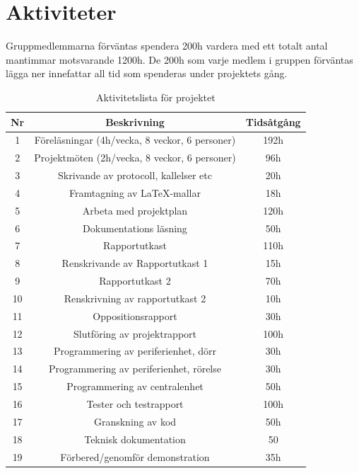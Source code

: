 \documentclass[a4paper]{article}
\begin{document}
\section{Aktiviteter}

Gruppmedlemmarna förväntas spendera 200h vardera med ett totalt antal mantimmar motsvarande 1200h. De 200h som varje medlem i gruppen förväntas lägga ner innefattar all tid som spenderas under projektets gång.

\begin{table}[H]
    \begin{center}
        \begin{tabular}{ |c|c|c| }\hline
            Nr & Beskrivning & Tidsåtgång \\\hline\hline
            1 & Föreläsningar (4h/vecka, 8 veckor, 6 personer) & 192h \\\hline
            2 & Projektmöten (2h/vecka, 8 veckor, 6 personer) & 96h \\\hline
            3 & Skrivande av protocoll, kallelser etc & 20h \\\hline
            4 & Framtagning av LaTeX-mallar & 18h \\\hline
            5 & Arbeta med projektplan & 120h \\\hline
            6 & Dokumentations läsning & 50h \\\hline
            7 & Rapportutkast & 110h \\\hline
            8 & Renskrivande av Rapportutkast 1 & 15h \\\hline
            9 & Rapportutkast 2 & 70h\\\hline
            10 & Renskrivning av rapportutkast 2 & 10h \\\hline
            11 & Oppositionsrapport & 30h\\\hline
            12 & Slutföring av projektrapport & 100h\\\hline
            13 & Programmering av periferienhet, dörr & 30h \\\hline
            14 & Programmering av periferienhet, rörelse & 30h \\\hline
            15 & Programmering av centralenhet & 50h \\\hline
            16 & Tester och testrapport & 100h\\\hline
            17 & Granskning av kod & 50h \\\hline
            18 & Teknisk dokumentation & 50 \\\hline
            19 & Förbered/genomför demonstration & 35h \\\hline
        \end{tabular}
        \caption{Aktivitetslista för projektet}
        \label{aktivitetslista}
    \end{center}
\end{table}
\end{document}
